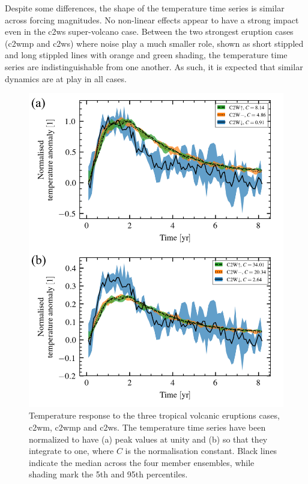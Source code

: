 \documentclass{ametsocV6.1}
\begin{document}
Despite some differences, the shape of the temperature time series is similar across
forcing magnitudes. No non-linear effects appear to have a strong impact even in the
\gls{c2ws} super-volcano case. Between the two strongest eruption cases (\gls{c2wmp} and
\gls{c2ws}) where noise play a much smaller role, shown as short stippled and long
stippled lines with orange and green shading, the temperature time series are
indistinguishable from one another. As such, it is expected that similar dynamics are at
play in all cases.


\begin{figure}
  \centering
  \includegraphics[width=0.95\linewidth]{figures/figure1.png}

  \caption{Temperature response to the three tropical volcanic eruptions cases,
    \gls{c2wm}, \gls{c2wmp} and \gls{c2ws}. The temperature time series have been normalized
    to have (a) peak values at unity and (b) so that they integrate to one, where \(C\) is
    the normalisation constant. Black lines indicate the median across the four member
    ensembles, while shading mark the 5th and 95th
    percentiles.}\label{fig:compare-waveform-temp}%
\end{figure}
\end{document}
